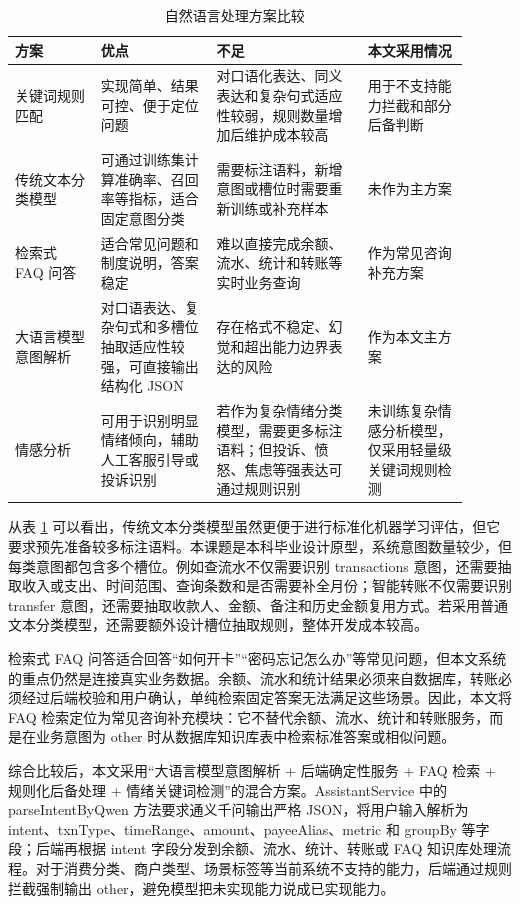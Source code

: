 \documentclass[bachelor, print]{xduthesis}
\begin{document}
\begin{table}[H]
    \centering
    \caption{自然语言处理方案比较}
    \label{tab:nlp-solution-compare}
    \small
    \setlength{\tabcolsep}{3pt}
    \begin{tabular}{|p{0.17\linewidth}|p{0.23\linewidth}|p{0.3\linewidth}|p{0.2\linewidth}|}
        \hline
        方案 & 优点 & 不足 & 本文采用情况 \\
        \hline
        关键词规则匹配 & 实现简单、结果可控、便于定位问题 & 对口语化表达、同义表达和复杂句式适应性较弱，规则数量增加后维护成本较高 & 用于不支持能力拦截和部分后备判断 \\
        \hline
        传统文本分类模型 & 可通过训练集计算准确率、召回率等指标，适合固定意图分类 & 需要标注语料，新增意图或槽位时需要重新训练或补充样本 & 未作为主方案 \\
        \hline
        检索式 FAQ 问答 & 适合常见问题和制度说明，答案稳定 & 难以直接完成余额、流水、统计和转账等实时业务查询 & 作为常见咨询补充方案 \\
        \hline
        大语言模型意图解析 & 对口语表达、复杂句式和多槽位抽取适应性较强，可直接输出结构化 JSON & 存在格式不稳定、幻觉和超出能力边界表达的风险 & 作为本文主方案 \\
        \hline
        情感分析 & 可用于识别明显情绪倾向，辅助人工客服引导或投诉识别 & 若作为复杂情绪分类模型，需要更多标注语料；但投诉、愤怒、焦虑等强表达可通过规则识别 & 未训练复杂情感分析模型，仅采用轻量级关键词规则检测 \\
        \hline
    \end{tabular}
\end{table}

从表 \ref{tab:nlp-solution-compare} 可以看出，传统文本分类模型虽然更便于进行标准化机器学习评估，但它要求预先准备较多标注语料。本课题是本科毕业设计原型，系统意图数量较少，但每类意图都包含多个槽位。例如查流水不仅需要识别 transactions 意图，还需要抽取收入或支出、时间范围、查询条数和是否需要补全月份；智能转账不仅需要识别 transfer 意图，还需要抽取收款人、金额、备注和历史金额复用方式。若采用普通文本分类模型，还需要额外设计槽位抽取规则，整体开发成本较高。

检索式 FAQ 问答适合回答“如何开卡”“密码忘记怎么办”等常见问题，但本文系统的重点仍然是连接真实业务数据。余额、流水和统计结果必须来自数据库，转账必须经过后端校验和用户确认，单纯检索固定答案无法满足这些场景。因此，本文将 FAQ 检索定位为常见咨询补充模块：它不替代余额、流水、统计和转账服务，而是在业务意图为 other 时从数据库知识库表中检索标准答案或相似问题。

综合比较后，本文采用“大语言模型意图解析 + 后端确定性服务 + FAQ 检索 + 规则化后备处理 + 情绪关键词检测”的混合方案。AssistantService 中的 parseIntentByQwen 方法要求通义千问输出严格 JSON，将用户输入解析为 intent、txnType、timeRange、amount、payeeAlias、metric 和 groupBy 等字段；后端再根据 intent 字段分发到余额、流水、统计、转账或 FAQ 知识库处理流程。对于消费分类、商户类型、场景标签等当前系统不支持的能力，后端通过规则拦截强制输出 other，避免模型把未实现能力说成已实现能力。
\end{document}
